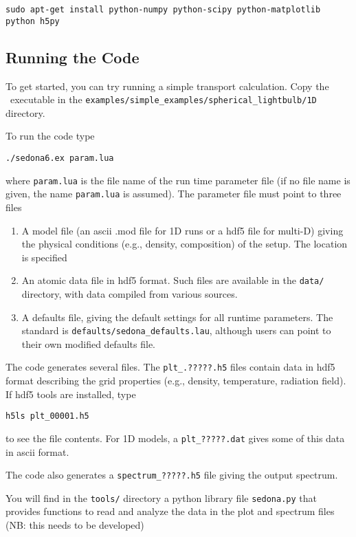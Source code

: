 \begin{verbatim}
sudo apt-get install python-numpy python-scipy python-matplotlib python h5py
\end{verbatim}



\subsection{Running the Code}

To get started, you can try running a simple transport calculation. Copy the \executable\ executable  in the {\tt examples/simple\_examples/spherical\_lightbulb/1D} directory. 

To run the code type 
\begin{Verbatim}
./sedona6.ex param.lua
\end{Verbatim}
 
where {\tt param.lua} is the file name of the run time parameter file (if no file name is given, the name {\tt param.lua} is assumed).  The parameter file must point to three files


\begin{enumerate}
	\item A model file  (an ascii .mod file for 1D runs or a hdf5 file for multi-D) giving the physical conditions (e.g., density, composition) of the setup. The location is specified 
	\item An atomic data file in hdf5 format. Such files are available in the {\tt data/} directory, with data compiled from various sources.
	\item A  defaults file, giving the default settings for all runtime parameters. The standard is {\tt defaults/sedona\_defaults.lau}, although users can point to their own modified defaults file.
\end{enumerate}

The code generates several files. The {\tt plt\_.?????.h5} files contain data in hdf5 format describing the grid properties (e.g., density, temperature, radiation field). If hdf5 tools are installed, type
\begin{Verbatim}
h5ls plt_00001.h5
\end{Verbatim}
to see the file contents. For 1D models, a {\tt plt\_?????.dat} gives some of this data in ascii format.

The code also generates a {\tt spectrum\_?????.h5} file giving the output spectrum.

You will find in the {\tt tools/} directory a python library file {\tt sedona.py} that provides functions to read and analyze the data in the plot and spectrum files (NB: this needs to be developed)


